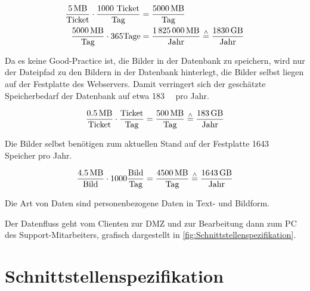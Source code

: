 \documentclass[a4paper,
    11pt,
    headings=small,
    ngerman,
    listof=totoc,
    numbers=noenddot]{scrreprt}[2021/11/13]
\begin{document}
\begin{align*}
  \frac{\SI{5}{\mega\byte}}{\text{Ticket}} \cdot \frac{1000\text{ Ticket}}{\text{Tag}} & = \frac{\SI{5000}{\mega\byte}}{\text{Tag}}                                                                  \\
  \frac{\SI{5000}{\mega\byte}}{\text{Tag}} \cdot 365 \text{Tage}                       & = \frac{\SI{1825000}{\mega\byte}}{\text{Jahr}} \stackrel{\wedge}= \frac{\SI{1830}{\giga\byte}}{\text{Jahr}}
\end{align*}


Da es keine Good-Practice ist, die Bilder in der Datenbank zu speichern, wird nur der Dateipfad zu den Bildern in der Datenbank hinterlegt, die Bilder selbst liegen auf der Festplatte des Webservers. Damit verringert sich der geschätzte Speicherbedarf der Datenbank auf etwa \SI{183}{\giga\byte} pro Jahr.

\begin{align*}
  \frac{\SI{0.5}{\mega\byte}}{\text{Ticket}} \cdot \frac{\text{Ticket}}{\text{Tag}} = \frac{\SI{500}{\mega\byte}}{\text{Tag}} \stackrel{\wedge}= \frac{\SI{183}{\giga\byte}}{\text{Jahr}}
\end{align*}

Die Bilder selbst benötigen zum aktuellen Stand auf der Festplatte \SI{1643}{\giga\byte} Speicher pro Jahr.

\begin{align*}
  \frac{\SI{4.5}{\mega\byte}}{\text{Bild}} \cdot 1000 \frac{\text{Bild}}{\text{Tag}} = \frac{\SI{4500}{\mega\byte}}{\text{Tag}} \stackrel{\wedge}= \frac{\SI{1643}{\giga\byte}}{\text{Jahr}}
\end{align*}

Die Art von Daten sind personenbezogene Daten in Text- und Bildform.

Der Datenfluss geht vom Clienten zur \ac{DMZ} und zur Bearbeitung dann zum PC des Support-Mitarbeiters, grafisch dargestellt in \vref{fig:Schnittstellenspezifikation}.



\newpage
\section{Schnittstellenspezifikation}
\end{document}
